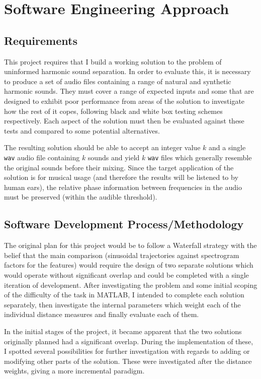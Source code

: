 \documentclass[10pt,twoside,a4paper]{report}
\begin{document}
\section{Software Engineering Approach}

\subsection{Requirements}

This project requires that I build a working solution to the problem of uninformed harmonic sound separation. In order to evaluate this, it is necessary to produce a set of audio files containing a range of natural and synthetic harmonic sounds. They must cover a range of expected inputs and some that are designed to exhibit poor performance from areas of the solution to investigate how the rest of it copes, following black and white box testing schemes respectively. Each aspect of the solution must then be evaluated against these tests and compared to some potential alternatives.

The resulting solution should be able to accept an integer value $ k $ and a single \texttt{wav} audio file containing $ k $ sounds and yield $ k $ \texttt{wav} files which generally resemble the original sounds before their mixing. Since the target application of the solution is for musical usage (and therefore the results will be listened to by human ears), the relative phase information between frequencies in the audio must be preserved (within the audible threshold).

\subsection{Software Development Process/Methodology}

The original plan for this project would be to follow a Waterfall strategy with the belief that the main comparison (sinusoidal trajectories against spectrogram factors for the features) would require the design of two separate solutions which would operate without significant overlap and could be completed with a single iteration of development. After investigating the problem and some initial scoping of the difficulty of the task in MATLAB, I intended to complete each solution separately, then investigate the internal parameters which weight each of the individual distance measures and finally evaluate each of them.

In the initial stages of the project, it became apparent that the two solutions originally planned had a significant overlap. During the implementation of these, I spotted several possibilities for further investigation with regards to adding or modifying other parts of the solution. These were investigated after the distance weights, giving a more incremental paradigm.
\end{document}

